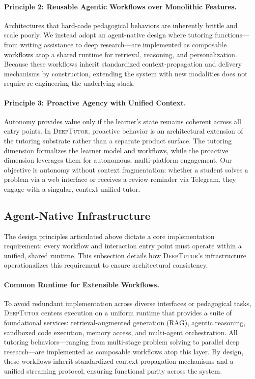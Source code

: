 \paragraph{Principle 2: Reusable Agentic Workflows over Monolithic Features.}
Architectures that hard-code pedagogical behaviors are inherently brittle and scale poorly. We instead adopt an agent-native design where tutoring functions—from writing assistance to deep research—are implemented as composable workflows atop a shared runtime for retrieval, reasoning, and personalization. Because these workflows inherit standardized context-propagation and delivery mechanisms by construction, extending the system with new modalities does not require re-engineering the underlying stack.
\paragraph{Principle 3: Proactive Agency with Unified Context.}
Autonomy provides value only if the learner’s state remains coherent across all entry points. In \textsc{DeepTutor}, proactive behavior is an architectural extension of the tutoring substrate rather than a separate product surface. The tutoring dimension formalizes the learner model and workflows, while the proactive dimension leverages them for autonomous, multi-platform engagement. Our objective is autonomy without context fragmentation: whether a student solves a problem via a web interface or receives a review reminder via Telegram, they engage with a singular, context-unified tutor.

\subsection{Agent-Native Infrastructure}
\label{sec:infrastructure}

The design principles articulated above dictate a core implementation requirement: every workflow and interaction entry point must operate within a unified, shared runtime. This subsection details how \textsc{DeepTutor}’s infrastructure operationalizes this requirement to ensure architectural consistency.

\paragraph{Common Runtime for Extensible Workflows. }To avoid redundant implementation across diverse interfaces or pedagogical tasks, \textsc{DeepTutor} centers execution on a uniform runtime that provides a suite of foundational services: retrieval-augmented generation (RAG), agentic reasoning, sandboxed code execution, memory access, and multi-agent orchestration. All tutoring behaviors—ranging from multi-stage problem solving to parallel deep research—are implemented as composable workflows atop this layer. By design, these workflows inherit standardized context-propagation mechanisms and a unified streaming protocol, ensuring functional parity across the system.
